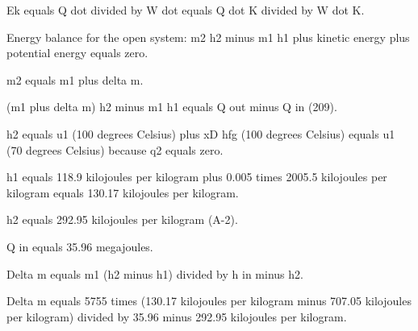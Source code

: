 Ek equals Q dot divided by W dot equals Q dot K divided by W dot K.

Energy balance for the open system:  
m2 h2 minus m1 h1 plus kinetic energy plus potential energy equals zero.  

m2 equals m1 plus delta m.  

(m1 plus delta m) h2 minus m1 h1 equals Q out minus Q in (209).  

h2 equals u1 (100 degrees Celsius) plus xD hfg (100 degrees Celsius) equals u1 (70 degrees Celsius) because q2 equals zero.  

h1 equals 118.9 kilojoules per kilogram plus 0.005 times 2005.5 kilojoules per kilogram equals 130.17 kilojoules per kilogram.  

h2 equals 292.95 kilojoules per kilogram (A-2).  

Q in equals 35.96 megajoules.  

Delta m equals m1 (h2 minus h1) divided by h in minus h2.  

Delta m equals 5755 times (130.17 kilojoules per kilogram minus 707.05 kilojoules per kilogram) divided by 35.96 minus 292.95 kilojoules per kilogram.